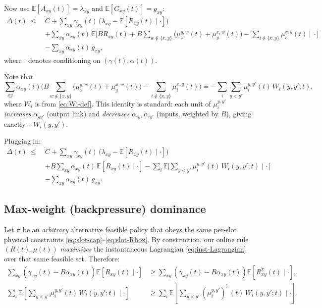 \documentclass[11pt]{article}
\newcommand{\E}{\mathbb{E}}
\begin{document}
Now use $\E[A_{xy}(t)]=\lambda_{xy}$ and $\E[G_{xy}(t)]=g_{xy}$:
\begin{equation}
\begin{aligned}
\Delta(t)\ \le\ &
C
+ \sum_{xy} \gamma_{xy}(t)\,
\big(\lambda_{xy} - \E[R_{xy}(t)\mid\cdot]\big) \\
&+ \sum_{xy} \alpha_{xy}(t)\,
\E\!\Big[
B R_{xy}(t)
+ B\sum_{w\notin\{x,y\}}\big(\mu_x^{y,w}(t)+\mu_y^{x,w}(t)\big)
- \sum_{i\notin\{x,y\}}\mu_i^{x,y}(t)
\ \Big|\ \cdot\Big]\\
&- \sum_{xy} \alpha_{xy}(t)\,g_{xy},
\end{aligned}
\label{eq:drift-rearrange}
\end{equation}
where $\cdot$ denotes conditioning on $(\gamma(t),\alpha(t))$.

Note that
\[
\sum_{xy} \alpha_{xy}(t)
\Big(
B\sum_{w\notin\{x,y\}}\big(\mu_x^{y,w}(t)+\mu_y^{x,w}(t)\big)
- \sum_{i\notin\{x,y\}}\mu_i^{x,y}(t)
\Big)
= - \sum_i \sum_{y<y'}
\mu_i^{y,y'}(t)\,W_i(y,y';t),
\]
where $W_i$ is from \eqref{eq:Wi-def}. This identity is standard: each unit of $\mu_i^{y,y'}$ \emph{increases} $\alpha_{yy'}$ (output link) and \emph{decreases} $\alpha_{iy},\alpha_{iy'}$ (inputs, weighted by $B$), giving exactly $-W_i(y,y')$.

Plugging in:
\begin{equation}
\begin{aligned}
\Delta(t)\ \le\ &
C
+ \sum_{xy} \gamma_{xy}(t)\,
\big(\lambda_{xy} - \E[R_{xy}(t)\mid\cdot]\big) \\
&+ B\sum_{xy} \alpha_{xy}(t)\,
\E[R_{xy}(t)\mid\cdot]
- \sum_i \E\!\Big[\sum_{y<y'}\mu_i^{y,y'}(t)\,W_i(y,y';t)\ \Big|\ \cdot\Big] \\
&- \sum_{xy} \alpha_{xy}(t)\,g_{xy}.
\end{aligned}
\label{eq:drift-node-form}
\end{equation}

\subsection{Max-weight (backpressure) dominance}

Let $\tilde\pi$ be an \emph{arbitrary} alternative feasible policy that obeys the same per-slot physical constraints \eqref{eq:slot-cap}--\eqref{eq:slot-Rbox}. By construction,
our online rule $(R(t),\mu(t))$ \emph{maximizes} the instantaneous Lagrangian \eqref{eq:inst-Lagrangian} over that same feasible set. Therefore:
\begin{align}
\sum_{xy} (\gamma_{xy}(t)-B\alpha_{xy}(t))
\E\!\left[R_{xy}(t)\mid\cdot\right]
&\ge
\sum_{xy} (\gamma_{xy}(t)-B\alpha_{xy}(t))
\E\!\left[R_{xy}^{\tilde\pi}(t)\mid\cdot\right],
\label{eq:maxweight-service}\\
\sum_i \E\!\left[\sum_{y<y'} \mu_i^{y,y'}(t)\,W_i(y,y';t)\mid\cdot\right]
&\ge
\sum_i \E\!\left[\sum_{y<y'} (\mu_i^{y,y'})^{\tilde\pi}(t)\,W_i(y,y';t)\mid\cdot\right].
\label{eq:maxweight-swap}
\end{align}
\end{document}
